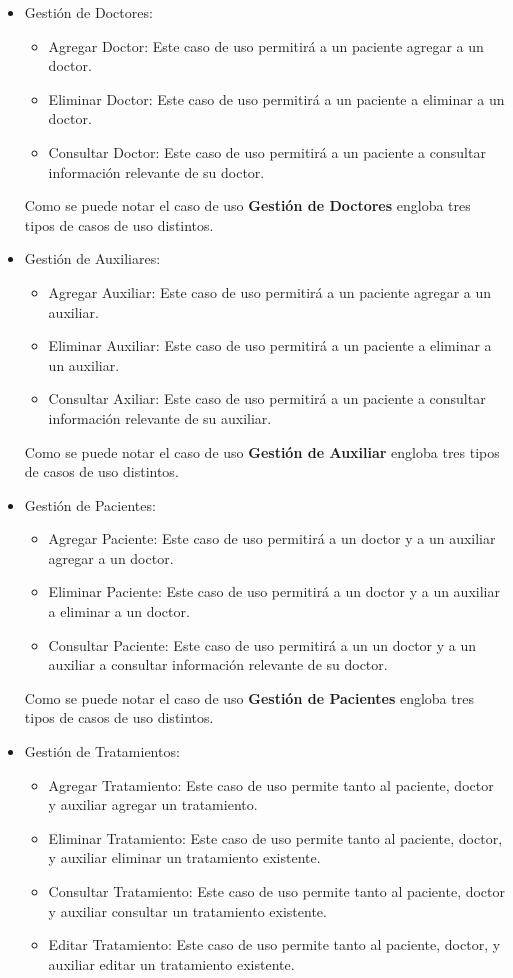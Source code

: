 \begin{itemize}
	
	\item Gestión de Doctores:
		\begin{itemize}
			\item Agregar Doctor: Este caso de uso permitirá a un paciente agregar a un doctor.
			\item Eliminar Doctor: Este caso de uso permitirá a un paciente a eliminar a un doctor.
			\item Consultar Doctor: Este caso de uso permitirá a un paciente a consultar información relevante de su doctor.
		\end{itemize}
	Como se puede notar el caso de uso \textbf{Gestión de Doctores} engloba tres tipos de casos de uso distintos.
	
	\item Gestión de Auxiliares:
	\begin{itemize}
		\item Agregar Auxiliar: Este caso de uso permitirá a un paciente agregar a un auxiliar.
		\item Eliminar Auxiliar: Este caso de uso permitirá a un paciente a eliminar a un auxiliar.
		\item Consultar Axiliar: Este caso de uso permitirá a un paciente a consultar información relevante de su auxiliar.
	\end{itemize}
	Como se puede notar el caso de uso \textbf{Gestión de Auxiliar} engloba tres tipos de casos de uso distintos.
	
	\item Gestión de Pacientes:
	\begin{itemize}
		\item Agregar Paciente: Este caso de uso permitirá a un doctor y a un auxiliar agregar a un doctor.
		\item Eliminar Paciente: Este caso de uso permitirá a un doctor y a un auxiliar a eliminar a un doctor.
		\item Consultar Paciente: Este caso de uso permitirá a un un doctor y a un auxiliar a consultar información relevante de su doctor.
	\end{itemize}
	Como se puede notar el caso de uso \textbf{Gestión de Pacientes} engloba tres tipos de casos de uso distintos.
	
	\item Gestión de Tratamientos: 
	\begin{itemize}
		\item Agregar Tratamiento: Este caso de uso permite tanto al paciente, doctor y auxiliar agregar un tratamiento.
		\item Eliminar Tratamiento: Este caso de uso permite tanto al paciente, doctor, y auxiliar eliminar un tratamiento existente.
		\item Consultar Tratamiento: Este caso de uso permite tanto al paciente, doctor y auxiliar consultar un tratamiento existente.
		\item Editar Tratamiento: Este caso de uso permite tanto al paciente, doctor, y auxiliar editar un tratamiento existente.
	\end{itemize}
	

\end{itemize}
